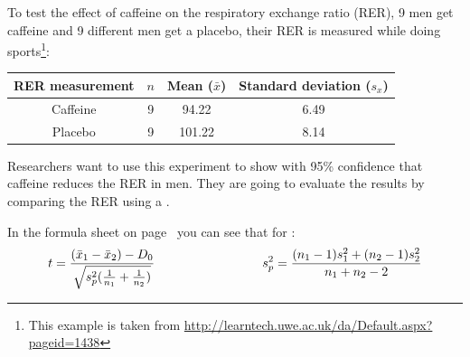 \setcounter{section}{5}
\setcounter{subsection}{3}
\setcounter{question}{0}



To test the effect of caffeine on the respiratory exchange ratio (RER), 9 men get caffeine and 9 different men get a placebo, their RER is measured while doing sports\footnote{This example is taken from \url{http://learntech.uwe.ac.uk/da/Default.aspx?pageid=1438}}: \\
\vspace*{0.5cm}
\begin{center}
\begin{tabular}{c|ccc}
RER measurement & $n$ & Mean ($\bar{x}$) & Standard deviation ($s_x$) \tstrut\bstrut\\
\hline
Caffeine & 9 & 94.22 & 6.49 \tstrut\bstrut\\
Placebo & 9 & 101.22 & 8.14 \tstrut\bstrut\\
\end{tabular}
\end{center}
\vspace*{0.5cm}

Researchers want to use this experiment to show with 95\% confidence that caffeine reduces the RER in men. They are going to evaluate the results by comparing the  RER using a . \\


\twolineanswerbox


\hypothesesbox

In the formula sheet on page~\pageref{formulasheet} you can see that for :
\vspace*{0.5cm}
\begin{equation*}
    t = \frac{(\bar{x}_1 - \bar{x}_2) - D_0}{\sqrt{s^2_p (\frac{1}{n_1} + \frac{1}{n_2})}}
    \hspace*{3cm}
    s^2_p = \frac{(n_1 - 1) s^2_1 + (n_2 - 1) s^2_2}{n_1 + n_2 - 2}
\end{equation*}
\vspace*{0.5cm}

